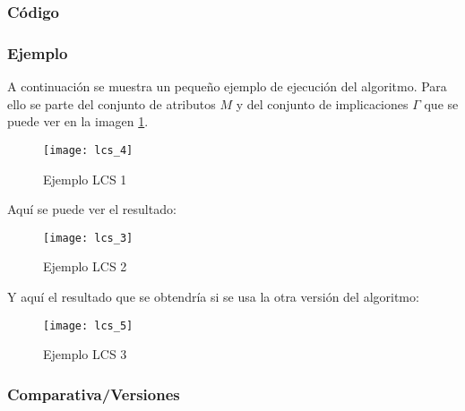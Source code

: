 \subsubsection{C\'odigo} 

\subsubsection{Ejemplo} 
A continuaci\'on se muestra un peque\~no ejemplo de ejecuci\'on del algoritmo. Para ello se parte del conjunto de atributos \(M\) y del conjunto de implicaciones \(\Gamma\) que se puede ver en la imagen \ref{fig:lcs_4}.
\begin{figure}[H]
    \centering
    \texttt{[image: lcs\_4]}
    \caption{Ejemplo LCS 1}
    \label{fig:lcs_4}
\end{figure} 
\newpage
Aqu\'i se puede ver el resultado:
\begin{figure}[H]
    \centering
    \texttt{[image: lcs\_3]}
    \caption{Ejemplo LCS 2}
    \label{fig:lcs_3}
\end{figure}

Y aqu\'i el resultado que se obtendr\'ia si se usa la otra versi\'on del algoritmo:
\begin{figure}[H]
    \centering
    \texttt{[image: lcs\_5]}
    \caption{Ejemplo LCS 3}
    \label{fig:lcs_5}
\end{figure}
\newpage
\subsubsection{Comparativa/Versiones} 